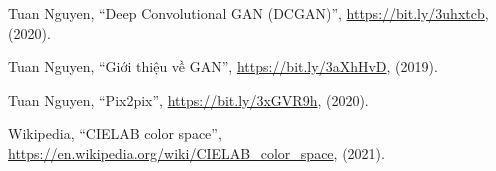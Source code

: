 \documentclass[a4paper]{article}
\begin{document}
\begin{thebibliography}{80}
     Tuan Nguyen, ``Deep Convolutional GAN (DCGAN)'', \href{https://bit.ly/3uhxtcb}{https://bit.ly/3uhxtcb}, (2020).

     Tuan Nguyen, ``Giới thiệu về GAN'', \href{https://bit.ly/3aXhHvD}{https://bit.ly/3aXhHvD}, (2019).

     Tuan Nguyen, ``Pix2pix'', \href{https://bit.ly/3xGVR9h}{https://bit.ly/3xGVR9h}, (2020).
    
     Wikipedia, ``CIELAB color space'', \href{https://en.wikipedia.org/wiki/CIELAB\_color\_space}{https://en.wikipedia.org/wiki/CIELAB\_color\_space}, (2021).

\end{thebibliography}
\end{document}
